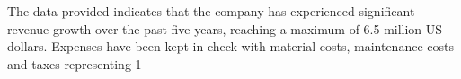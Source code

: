 

The data provided indicates that the company has experienced significant revenue growth over the past five years, reaching a maximum of 6.5 million US dollars. Expenses have been kept in check with material costs, maintenance costs and taxes representing 1%